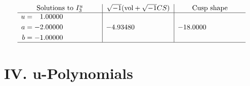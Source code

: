 \documentclass[1p]{elsarticle_modified}
\theoremstyle{definition}
\newcommand{\I}{\sqrt{-1}}
\begin{document}
$$\begin{array}{c|c|c}  
\text{Solutions to }I^u_{3}& \I (\text{vol} + \sqrt{-1}CS) & \text{Cusp shape}\\
 \hline 
\begin{aligned}
u &= \phantom{-}1.00000\phantom{ +0.000000I} \\
a &= -2.00000\phantom{ +0.000000I} \\
b &= -1.00000\phantom{ +0.000000I}\end{aligned}
 & -4.93480\phantom{ +0.000000I} & -18.0000\phantom{ +0.000000I}\\
 \hline 
 \end{array}$$\newpage
\newpage\renewcommand{\arraystretch}{1}
\centering \section*{ IV. u-Polynomials}
\end{document}
